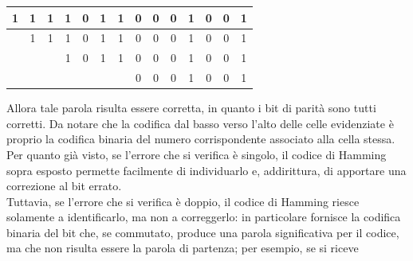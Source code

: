 \documentclass[a4paper]{extarticle}
\renewcommand\arraystretch{}
\begin{document}
\noindent
\begin{table}[H]
\setlength{\tabcolsep}{4pt}
\renewcommand{\arraystretch}{1.2}
\centering
\begin{tabular}{|c|c|c|c|c|c|c|c|c|c|c|c|c|c|}
    \hline
    \cellcolor{orange!75!white}1 & 1 & \cellcolor{orange!25!white}1 & 1 & \cellcolor{orange!25!white}0 & 1 & \cellcolor{orange!25!white}1 & 0 & \cellcolor{orange!25!white}0 & 0 & \cellcolor{orange!25!white}1 & 0 & \cellcolor{orange!25!white}0 & 1\\
    \hline
     & \cellcolor{orange!75!white}1 & \cellcolor{orange!25!white}1 & 1 & 0 & \cellcolor{orange!25!white}1 & \cellcolor{orange!25!white}1 & 0 & 0 & \cellcolor{orange!25!white}0 & \cellcolor{orange!25!white}1 & 0 & 0 & \cellcolor{orange!25!white}1\\
    \hline
     &  &  & \cellcolor{orange!75!white}1 & \cellcolor{orange!25!white}0 & \cellcolor{orange!25!white}1 & \cellcolor{orange!25!white}1 & 0 & 0 & 0 & 1 & \cellcolor{orange!25!white}0 & \cellcolor{orange!25!white}0 & \cellcolor{orange!25!white}1\\
    \hline
     &  &  &  &  &  &  & \cellcolor{orange!75!white}0 & \cellcolor{orange!25!white}0 & \cellcolor{orange!25!white}0 & \cellcolor{orange!25!white}1 & \cellcolor{orange!25!white}0 & \cellcolor{orange!25!white}0 & \cellcolor{orange!25!white}1\\
    \hline
\end{tabular}
\end{table}

\vspace{1em}
\noindent
Allora tale parola risulta essere corretta, in quanto i bit di parità sono tutti corretti. Da notare che la codifica dal basso verso l'alto delle celle evidenziate è proprio la codifica binaria del numero corrispondente associato alla cella stessa.\\
Per quanto già visto, se l'errore che si verifica è singolo, il codice di Hamming sopra esposto permette facilmente di individuarlo e, addirittura, di apportare una correzione al bit errato.\\
Tuttavia, se l'errore che si verifica è doppio, il codice di Hamming riesce solamente a identificarlo, ma non a correggerlo: in particolare fornisce la codifica binaria del bit che, se commutato, produce una parola significativa per il codice, ma che non risulta essere la parola di partenza; per esempio, se si riceve
\end{document}
